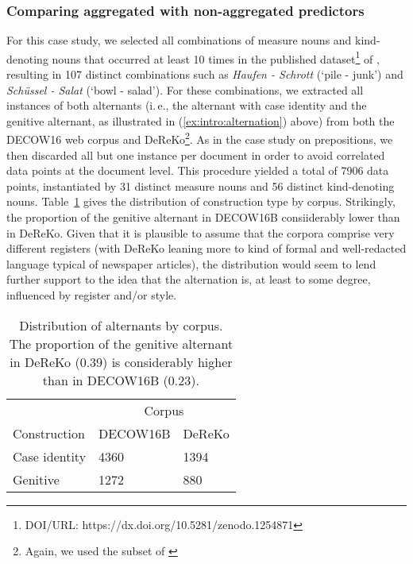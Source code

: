 \subsubsection{Comparing aggregated with non-aggregated predictors}

For this case study, we selected all combinations of measure nouns and kind-denoting nouns that occurred at least 10 times in the published dataset\footnote{DOI/URL: https://dx.doi.org/10.5281/zenodo.1254871} of \cite{Schaefer2018}, resulting in 107 distinct combinations such as \textit{Haufen - Schrott} (`pile - junk') and \textit{Schüssel - Salat} (`bowl - salad'). For these combinations, we extracted all instances of both alternants (i.\,e., the alternant with case identity and the genitive alternant, as illustrated in (\ref{ex:intro:alternation}) above) from both the DECOW16 web corpus and DeReKo\footnote{Again, we used the subset of \cite{Bubenhofer-ea2014}}. As in the case study on prepositions, we then discarded all but one instance per document in order to avoid correlated data points at the document level. This procedure yielded a total of 7906 data points, instantiated by 31 distinct measure nouns and 56 distinct kind-denoting nouns. Table~\ref{mn-dataset-summary} gives the distribution of construction type by corpus. Strikingly, the proportion of the genitive alternant in DECOW16B consiiderably lower than in DeReKo. Given that it is plausible to assume that the corpora comprise very different registers (with DeReKo leaning more to kind of formal and well-redacted language typical of newspaper articles), the distribution would seem to lend further support to the idea that the alternation is, at least to some degree, influenced by register and/or style.

\begin{table}
  \begin{tabular}{lll}
  \toprule
                 & \multicolumn{2}{c}{Corpus}\\
  Construction   & DECOW16B & DeReKo\\
  \midrule
  Case identity  &  4360    & 1394 \\
  Genitive       &  1272    & 880 \\
  \bottomrule
  \end{tabular}
  \caption{Distribution of alternants by corpus. The proportion of the genitive alternant in DeReKo (0.39) is considerably higher than in DECOW16B (0.23).}\label{mn-dataset-summary}  
\end{table}


